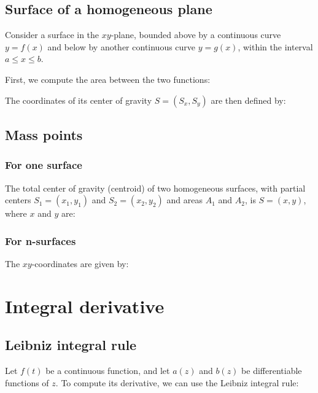 \documentclass{article}
\begin{document}
\subsection{Surface of a homogeneous plane}
Consider a surface in the $xy$-plane, bounded above by a continuous
curve $y=f(x)$ and below by another continuous curve $y=g(x)$, within
the interval $a \leq x \leq b$.

First, we compute the area between the two functions:


The coordinates of its center of gravity $S=(S_x, S_y)$ are then
defined by:

\subsection{Mass points}
\subsubsection{For one surface}
The total center of gravity (centroid) of two homogeneous surfaces,
with partial centers $S_1 = (x_1, y_1)$ and $S_2 = (x_2, y_2)$ and
areas $A_1$ and $A_2$, is $S = (x, y)$, where $x$ and $y$ are:

\subsubsection{For n-surfaces}
The $xy$-coordinates are given by:

\newpage
\section{Integral derivative}
\subsection{Leibniz integral rule}
Let $f(t)$ be a continuous function, and let $a(z)$ and $b(z)$ 
be differentiable functions of $z$. To compute its derivative,
we can use the Leibniz integral rule:
\end{document}
